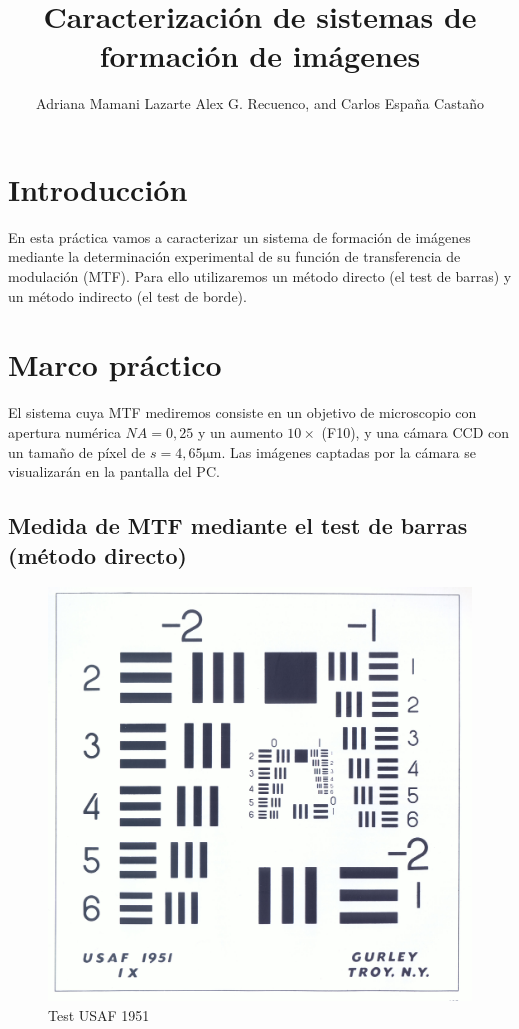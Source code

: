 \documentclass{./packages/optica-article}
\begin{document}
\title{Caracterización de sistemas de formación de imágenes}

\author{Adriana Mamani Lazarte Alex G. Recuenco, and Carlos España Castaño}

\address{Universidad Complutense de Madrid, Madrid, PC 28040, España}

\section{Introducción}
En esta práctica vamos a caracterizar un sistema de formación de imágenes mediante la determinación experimental de su función de transferencia de modulación (MTF). Para ello utilizaremos un método directo (el test de barras) y un método indirecto (el test de borde). 


\section{Marco práctico}
El sistema cuya MTF mediremos consiste en un objetivo de microscopio con apertura numérica $NA = 0,25$ y un aumento $10\times$ (F10), y una cámara CCD con un tamaño de píxel de $s=4,65 \unit{\micro\meter}$. Las imágenes captadas por la cámara se visualizarán en la pantalla del PC.

\subsection{Medida de MTF mediante el test de barras (método directo)}\label{sec:directo}

\begin{figure}[h]
	\centering
	\includegraphics[scale=0.05]{testusaf1951}
	\caption{Test USAF 1951}\label{fig:usaf1951}
\end{figure}
\end{document}
